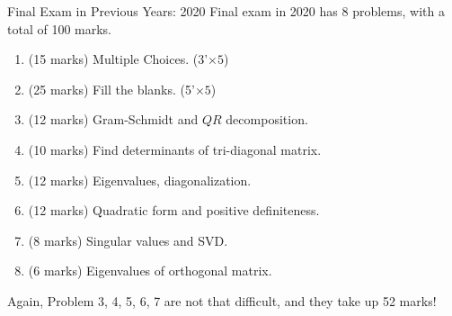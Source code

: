 \documentclass{beamer}
\begin{document}
\begin{frame}{Final Exam in Previous Years: 2020}
Final exam in 2020 has 8 problems, with a total of 100 marks.
\begin{enumerate}
    \item (15 marks) Multiple Choices. (3'$\times 5$)
    \item (25 marks) Fill the blanks. (5'$\times 5$)
    \item (12 marks) Gram-Schmidt and $QR$ decomposition.
    \item (10 marks) Find determinants of tri-diagonal matrix.
    \item (12 marks) Eigenvalues, diagonalization.
    \item (12 marks) Quadratic form and positive definiteness.
    \item (8 marks) Singular values and SVD.
    \item (6 marks) Eigenvalues of orthogonal matrix.
\end{enumerate}

\vspace{3pt}
Again, Problem 3, 4, 5, 6, 7 are not that difficult, and they take up 52 marks!
\end{frame}
\end{document}
